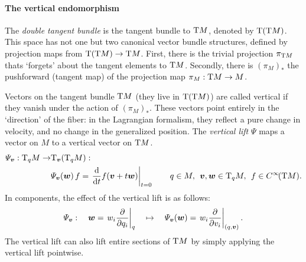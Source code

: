 \paragraph{The vertical endomorphism} The \emph{double tangent bundle} is the tangent bundle to $\mathrm{T}M$, denoted by $\mathrm{T}(\mathrm{T}M)$. This space has not one but two canonical vector bundle structures, defined by projection maps from $\mathrm{T}(\mathrm{T}M) \to \mathrm{T}M$. First, there is the trivial projection $\pi_{\mathrm{T}M}$ thats `forgets' about the tangent elements to $\mathrm{T}M$. Secondly, there is $ (\pi_{M})_* $ the pushforward (tangent map) of the projection map $\pi_M: \mathrm{T}M \to M$. \cite{Abraham1978}
\begin{center}
\end{center}
Vectors on the tangent bundle $\mathrm{T}M$ (they live in $\mathrm{T}(\mathrm{T}M)$) are called vertical if they vanish under the action of $ (\pi_M)_* $. These vectors point entirely in the `direction' of the fiber: in the Lagrangian formalism, they reflect a pure change in velocity, and no change in the generalized position. The \emph{vertical lift} $\Psi$ maps a vector on $M$ to a vertical vector on $\mathrm{T}M$. \cite{Carinena1990}
\begin{equation}
    \begin{split}
        \Psi_{\vec{v}}: \tspace{q}{M} \to & \tspace{\vec{v}}{\qty(\tspace{q}{M})}: \\ 
        & \Psi_{\vec{v}}(\vec{w})\,f = \left. \dv{}{t} f(\vec{v} + t\vec{w})\right |_{t = 0}
        \qquad q \in M,\:\: \vec{v},\vec{w}\in \tspace{q}{M},\:\: f \in \functions{\tbundle{M}}.
    \end{split}
\end{equation}
In components, the effect of the vertical lift is as follows:
$$\Psi_{\vec{v}}: \quad \vec{w} = \left. w_i \pdv{}{q_i}\right|_q \quad \mapsto \quad  \Psi_{\vec{v}}(\vec{w}) = \left.w_i \pdv{}{v_i}\right|_{(q, \vec{v})}. $$
The vertical lift can also lift entire sections of $\mathrm{T}M$ by simply applying the vertical lift pointwise.

